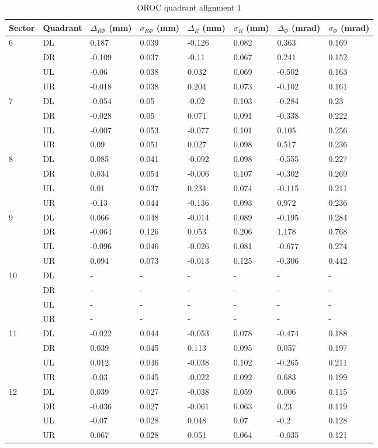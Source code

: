 \begin{table}
\caption{OROC quadrant alignment 1}
\begin{tabular}{|l|l|l|l|l|l|l|l|} \hline
Sector & Quadrant & $\Delta_{R\Phi}$ (mm)& $\sigma_{R\Phi}$ (mm) &
 $\Delta_{R}$ (mm)& $\sigma_{R}$ (mm) & $\Delta_{\Phi}$ (mrad)& $\sigma_{\Phi}$ (mrad)\\ \hline
6&DL&0.187&0.039&-0.126&0.082&0.363&0.169\\ \hline
&DR&-0.109&0.037&-0.11&0.067&0.241&0.152\\ \hline
&UL&-0.06&0.038&0.032&0.069&-0.502&0.163\\ \hline
&UR&-0.018&0.038&0.204&0.073&-0.102&0.161\\ \hline
7&DL&-0.054&0.05&-0.02&0.103&-0.284&0.23\\ \hline
&DR&-0.028&0.05&0.071&0.091&-0.338&0.222\\ \hline
&UL&-0.007&0.053&-0.077&0.101&0.105&0.256\\ \hline
&UR&0.09&0.051&0.027&0.098&0.517&0.236\\ \hline
8&DL&0.085&0.041&-0.092&0.098&-0.555&0.227\\ \hline
&DR&0.034&0.054&-0.006&0.107&-0.302&0.269\\ \hline
&UL&0.01&0.037&0.234&0.074&-0.115&0.211\\ \hline
&UR&-0.13&0.044&-0.136&0.093&0.972&0.236\\ \hline
9&DL&0.066&0.048&-0.014&0.089&-0.195&0.284\\ \hline
&DR&-0.064&0.126&0.053&0.206&1.178&0.768\\ \hline
&UL&-0.096&0.046&-0.026&0.081&-0.677&0.274\\ \hline
&UR&0.094&0.073&-0.013&0.125&-0.306&0.442\\ \hline
10&DL&-&-&-&-&-&-\\ \hline
&DR&-&-&-&-&-&-\\ \hline
&UL&-&-&-&-&-&-\\ \hline
&UR&-&-&-&-&-&-\\ \hline
11&DL&-0.022&0.044&-0.053&0.078&-0.474&0.188\\ \hline
&DR&0.039&0.045&0.113&0.095&0.057&0.197\\ \hline
&UL&0.012&0.046&-0.038&0.102&-0.265&0.211\\ \hline
&UR&-0.03&0.045&-0.022&0.092&0.683&0.199\\ \hline
12&DL&0.039&0.027&-0.038&0.059&0.006&0.115\\ \hline
&DR&-0.036&0.027&-0.061&0.063&0.23&0.119\\ \hline
&UL&-0.07&0.028&0.048&0.07&-0.2&0.128\\ \hline
&UR&0.067&0.028&0.051&0.064&-0.035&0.121\\ \hline
\end{tabular}
\label{table:QudrantAlignement}
\end{table}

